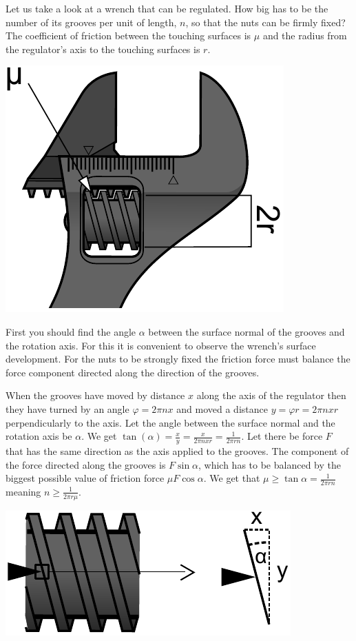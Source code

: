 Let us take a look at a wrench that can be regulated. How big has to be the number of its grooves per unit of length, $n$, so that the nuts can be firmly fixed? The coefficient of friction between the touching surfaces is $\mu$ and the radius from the regulator’s axis to the touching surfaces is $r$.
\begin{center}%
\includegraphics[width=0.4\linewidth]{2015-lahg-09-mutriv6ti_joonis}%
\end{center}

\hinteng
First you should find the angle $\alpha$ between the surface normal of the grooves and the rotation axis. For this it is convenient to observe the wrench’s surface development. For the nuts to be strongly fixed the friction force must balance the force component directed along the direction of the grooves.

\solueng
When the grooves have moved by distance $x$ along the axis of the regulator then they have turned by an angle $\varphi=2\pi nx$ and moved a distance $y=\varphi r=2\pi nxr$ perpendicularly to the axis. Let the angle between the surface normal and the rotation axis be $\alpha$. We get $\tan(\alpha)=\frac{x}{y}=\frac{x}{2\pi nxr}=\frac{1}{2\pi rn}$. Let there be force $F$ that has the same direction as the axis applied to the grooves. The component of the force directed along the grooves is $F\sin\alpha$, which has to be balanced by the biggest possible value of friction force $\mu F\cos\alpha$. We get that $\mu\geq\tan\alpha=\frac{1}{2\pi rn}$ meaning $n\ge\frac{1}{2\pi r\mu}$.
\begin{center}
\includegraphics[width=0.5\linewidth]{2015-lahg-09-mutriv6ti_lahendus}
\end{center}
\probend